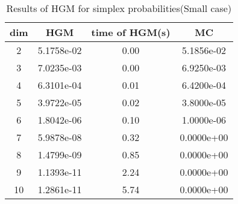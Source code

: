 \begin{table}[htbp]
\begin{center}
\begin{tabular}{cccc}
dim& HGM & time of HGM(s) & MC\\
\hline
2 & 5.1758e-02 & 0.00 & 5.1856e-02\\
3 & 7.0235e-03 & 0.00 & 6.9250e-03\\
4 & 6.3101e-04 & 0.01 & 6.4200e-04\\
5 & 3.9722e-05 & 0.02 & 3.8000e-05\\
6 & 1.8042e-06 & 0.10 & 1.0000e-06\\
7 & 5.9878e-08 & 0.32 & 0.0000e+00\\
8 & 1.4799e-09 & 0.85 & 0.0000e+00\\
9 & 1.1393e-11 & 2.24 & 0.0000e+00\\
10 & 1.2861e-11 & 5.74 & 0.0000e+00\\
\hline
\end{tabular}
\end{center}
\caption{Results of HGM for simplex probabilities(Small case)}
\label{tab3}
\end{table}

